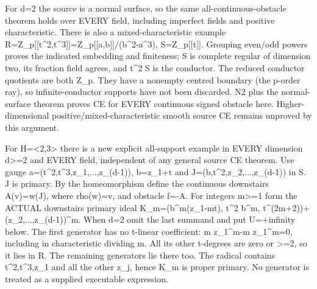 \documentclass[11pt]{article}
\begin{document}
For d=2 the source is a normal surface, so the same all-continuous-obstacle theorem holds over EVERY field, including imperfect fields and positive characteristic. There is also a mixed-characteristic example R=Z\_p[[t\textasciicircum{}2,t\textasciicircum{}3]]=Z\_p[[a,b]]/(b\textasciicircum{}2-a\textasciicircum{}3), S=Z\_p[[t]]. Grouping even/odd powers proves the indicated embedding and finiteness; S is complete regular of dimension two, its fraction field agrees, and t\textasciicircum{}2 S is the conductor. The reduced conductor quotients are both Z\_p. They have a nonempty centred boundary (the p-order ray), so infinite-conductor supports have not been discarded. N2 plus the normal-surface theorem proves CE for EVERY continuous signed obstacle here. Higher-dimensional positive/mixed-characteristic smooth source CE remains unproved by this argument.

For H=\textless{}2,3\textgreater{} there is a new explicit all-support example in EVERY dimension d\textgreater{}=2 and EVERY field, independent of any general source CE theorem. Use gauge a=(t\textasciicircum{}2,t\textasciicircum{}3,z\_1,...,z\_(d-1)), b=z\_1+t and J=(b,t\textasciicircum{}2,z\_2,...,z\_(d-1)) in S. J is primary. By the homeomorphism define the continuous downstairs A(v)=w(J), where rho(w)=v, and obstacle f=-A. For integers m\textgreater{}=1 form the ACTUAL downstairs primary ideal
K\_m=(b\textasciicircum{}m(z\_1-mt), t\textasciicircum{}2 b\textasciicircum{}m, t\textasciicircum{}(2m+2))+(z\_2,...,z\_(d-1))\textasciicircum{}m.
When d=2 omit the last summand and put U=+infinity below. The first generator has no t-linear coefficient: m z\_1\textasciicircum{}m-m z\_1\textasciicircum{}m=0, including in characteristic dividing m. All its other t-degrees are zero or \textgreater{}=2, so it lies in R. The remaining generators lie there too. The radical contains t\textasciicircum{}2,t\textasciicircum{}3,z\_1 and all the other z\_j, hence K\_m is proper primary. No generator is treated as a supplied executable expression.
\end{document}
